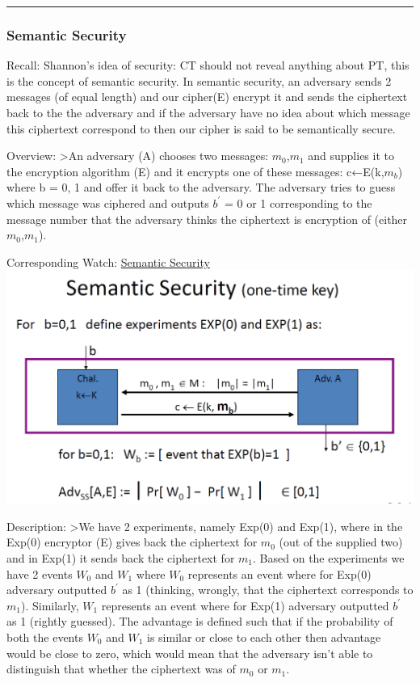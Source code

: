 \documentclass[11pt]{article}
\makeatletter
\def\maxwidth{\ifdim\Gin@nat@width>\linewidth\linewidth
    \else\Gin@nat@width\fi}
\let\Oldincludegraphics\includegraphics
\renewcommand{\includegraphics}[1]{\Oldincludegraphics[width=.8\maxwidth]{#1}}
\makeatother
\begin{document}
\begin{center}\rule{0.5\linewidth}{\linethickness}\end{center}

    \hypertarget{semantic-security}{%
\subsubsection{Semantic Security}\label{semantic-security}}

Recall: Shannon's idea of security: CT should not reveal anything about
PT, this is the concept of semantic security. In semantic security, an
adversary sends 2 messages (of equal length) and our cipher(E) encrypt
it and sends the ciphertext back to the the adversary and if the
adversary have no idea about which message this ciphertext correspond to
then our cipher is said to be semantically secure.

Overview: \textgreater{}An adversary (A) chooses two messages:
\(m_{0}\),\(m_{1}\) and supplies it to the encryption algorithm (E) and
it encrypts one of these messages: c←E(k,\(m_{b}\)) where b = 0, 1 and
offer it back to the adversary. The adversary tries to guess which
message was ciphered and outputs \(b^{'}\) = 0 or 1 corresponding to the
message number that the adversary thinks the ciphertext is encryption of
(either \(m_{0}\),\(m_{1}\)).

Corresponding Watch:
\href{https://www.coursera.org/learn/crypto/lecture/q0h9g/semantic-security}{Semantic
Security}\\
\includegraphics{./Images/SemanticSecurity.png}

Description: \textgreater{}We have 2 experiments, namely Exp(0) and
Exp(1), where in the Exp(0) encryptor (E) gives back the ciphertext for
\(m_{0}\) (out of the supplied two) and in Exp(1) it sends back the
ciphertext for \(m_{1}\). Based on the experiments we have 2 events
\(W_{0}\) and \(W_{1}\) where \(W_{0}\) represents an event where for
Exp(0) adversary outputted \(b^{'}\) as 1 (thinking, wrongly, that the
ciphertext corresponds to \(m_{1}\)). Similarly, \(W_{1}\) represents an
event where for Exp(1) adversary outputted \(b^{'}\) as 1 (rightly
guessed). The advantage is defined such that if the probability of both
the events \(W_{0}\) and \(W_{1}\) is similar or close to each other
then advantage would be close to zero, which would mean that the
adversary isn't able to distinguish that whether the ciphertext was of
\(m_{0}\) or \(m_{1}\).
\end{document}
